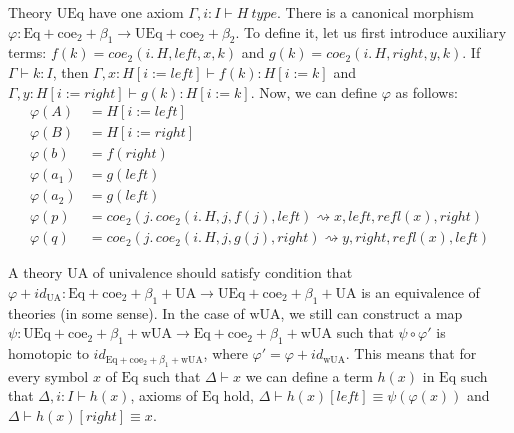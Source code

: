 \documentclass[reqno]{amsart}
\theoremstyle{definition}
\theoremstyle{remark}
\newcommand{\deq}{\equiv}
\newcommand{\repl}{:=}
\newcommand{\idtype}{\rightsquigarrow}
\newcommand{\wUA}{\mathrm{wUA}}
\newcommand{\UA}{\mathrm{UA}}
\newcommand{\coe}{\mathrm{coe}}
\newcommand{\Eq}{\mathrm{Eq}}
\newcommand{\UEq}{\mathrm{UEq}}
\numberwithin{figure}{section}
\begin{document}
Theory $\UEq$ have one axiom $\Gamma, i : I \vdash H\ type$.
There is a canonical morphism $\varphi : \Eq + \coe_2 + \beta_1 \to \UEq + \coe_2 + \beta_2$.
To define it, let us first introduce auxiliary terms: $f(k) = coe_2(i.\,H, left, x, k)$ and $g(k) = coe_2(i.\,H, right, y, k)$.
If $\Gamma \vdash k : I$, then $\Gamma, x : H[i \repl left] \vdash f(k) : H[i \repl k]$ and $\Gamma, y : H[i \repl right] \vdash g(k) : H[i \repl k]$.
Now, we can define $\varphi$ as follows:
\begin{align*}
\varphi(A) & = H[i \repl left] \\
\varphi(B) & = H[i \repl right] \\
\varphi(b) & = f(right) \\
\varphi(a_1) & = g(left) \\
\varphi(a_2) & = g(left) \\
\varphi(p) & = coe_2(j.\,coe_2(i.\,H, j, f(j), left) \idtype x, left, refl(x), right) \\
\varphi(q) & = coe_2(j.\,coe_2(i.\,H, j, g(j), right) \idtype y, right, refl(x), left)
\end{align*}

A theory $\UA$ of univalence should satisfy condition that $\varphi + id_{\UA} : \Eq + \coe_2 + \beta_1 + \UA \to \UEq + \coe_2 + \beta_1 + \UA$ is an equivalence of theories (in some sense).
In the case of $\wUA$, we still can construct a map $\psi : \UEq + \coe_2 + \beta_1 + \wUA \to \Eq + \coe_2 + \beta_1 + \wUA$ such that $\psi \circ \varphi'$ is homotopic to $id_{\Eq + \coe_2 + \beta_1 + \wUA}$, where $\varphi' = \varphi + id_{\wUA}$.
This means that for every symbol $x$ of $\Eq$ such that $\Delta \vdash x$ we can define a term $h(x)$ in $\Eq$ such that
$\Delta, i : I \vdash h(x)$, axioms of $\Eq$ hold, $\Delta \vdash h(x)[left] \deq \psi(\varphi(x))$ and $\Delta \vdash h(x)[right] \deq x$.
\end{document}
